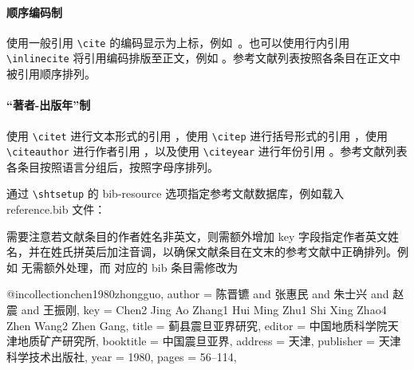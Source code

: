 \documentclass[bachelor, comfort]{shtthesis}
\begin{document}
\paragraph{顺序编码制}
使用一般引用 \verb|\cite| 的编码显示为上标，例如~\cite{stamerjohanns2009mathml, yuan2012lanc}。也可以使用行内引用 \verb|\inlinecite| 将引用编码排版至正文，例如 。参考文献列表按照各条目在正文中被引用顺序排列。

\paragraph{“著者-出版年”制}
使用 \verb|\citet| 进行文本形式的引用 \citet{Bohan1928}，使用 \verb|\citep| 进行括号形式的引用 \citep{yuan2012lanc}，使用 \verb|\citeauthor| 进行作者引用 \citeauthor{niu2013zonghe}，以及使用 \verb|\citeyear| 进行年份引用 \citeyear{walls2013drought}。参考文献列表各条目按照语言分组后，按照字母序排列。

\shtthesis{} 通过 \verb|\shtsetup| 的 bib-resource 选项指定参考文献数据库，例如载入 reference.bib 文件：

需要注意若文献条目的作者姓名非英文，则需额外增加 key 字段指定作者英文姓名，并在姓氏拼英后加注音调，以确保文献条目在文末的参考文献中正确排列。例如 \citet{bravo1990comparative} 无需额外处理，而 \citet{chen1980zhongguo} 对应的 bib 条目需修改为
\begin{latex}
@incollection{chen1980zhongguo,
  author    = {陈晋镳 and 张惠民 and 朱士兴 and 赵震 and 王振刚},
  key       = {Chen2 Jing Ao Zhang1 Hui Ming Zhu1 Shi Xing Zhao4 Zhen Wang2 Zhen Gang},
  title     = {蓟县震旦亚界研究},
  editor    = {中国地质科学院天津地质矿产研究所},
  booktitle = {中国震旦亚界},
  address   = {天津},
  publisher = {天津科学技术出版社},
  year      = {1980},
  pages     = {56--114},
}
\end{latex}
\end{document}
